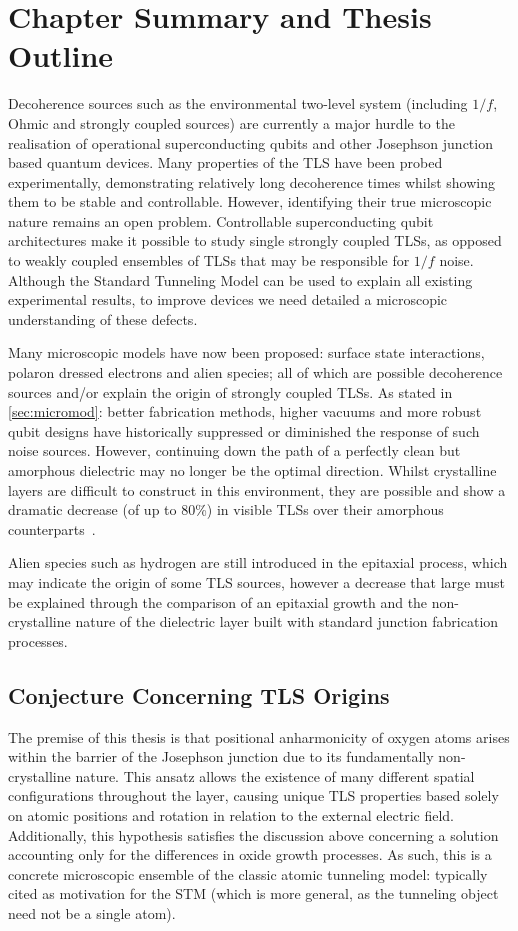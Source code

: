\section{Chapter Summary and Thesis Outline}

Decoherence sources such as the environmental two-level system (including $1/f$, Ohmic and strongly coupled sources) are currently a major hurdle to the realisation of operational superconducting qubits and other Josephson junction based quantum devices.
Many properties of the TLS have been probed experimentally, demonstrating relatively long decoherence times whilst showing them to be stable and controllable.
However, identifying their true microscopic nature remains an open problem. Controllable superconducting qubit architectures make it possible to study single strongly coupled TLSs, as opposed to weakly coupled ensembles of TLSs that may be responsible for $1/f$ noise.
Although the Standard Tunneling Model can be used to explain all existing experimental results, to improve devices we need detailed a microscopic understanding of these defects.

Many microscopic models have now been proposed: surface state interactions, polaron dressed electrons and alien species; all of which are possible decoherence sources and/or explain the origin of strongly coupled TLSs.
As stated in \cref{sec:micromod}: better fabrication methods, higher vacuums and more robust qubit designs have historically suppressed or diminished the response of such noise sources.
However, continuing down the path of a perfectly clean but amorphous dielectric may no longer be the optimal direction.
Whilst crystalline layers are difficult to construct in this environment, they are possible and show a dramatic decrease (of up to 80\%) in visible TLSs over their amorphous counterparts~\cite{Oh2006}.

Alien species such as hydrogen are still introduced in the epitaxial process, which may indicate the origin of some TLS sources, however a decrease that large must be explained through the comparison of an epitaxial growth and the non-crystalline nature of the dielectric layer built with standard junction fabrication processes.

\subsection{Conjecture Concerning TLS Origins}

The premise of this thesis is that positional anharmonicity of oxygen atoms arises within the  barrier of the Josephson junction due to its fundamentally non-crystalline nature.
This ansatz allows the existence of many different spatial configurations throughout the layer, causing unique TLS properties based solely on atomic positions and rotation in relation to the external electric field.
Additionally, this hypothesis satisfies the discussion above concerning a solution accounting only for the differences in oxide growth processes.
As such, this is a concrete microscopic ensemble of the classic atomic tunneling model: typically cited as motivation for the STM (which is more general, as the tunneling object need not be a single atom).

